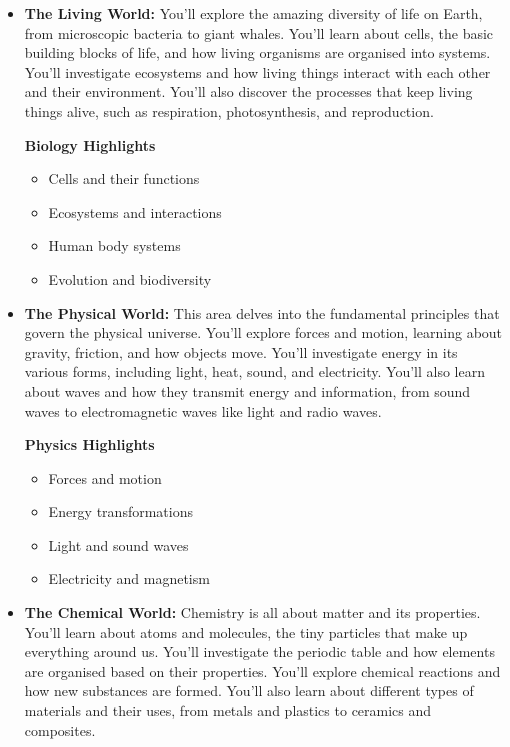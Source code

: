 \begin{itemize}
    \item \textbf{The Living World:}  You'll explore the amazing diversity of life on Earth, from microscopic bacteria to giant whales. You’ll learn about cells, the basic building blocks of life, and how living organisms are organised into systems. You'll investigate ecosystems and how living things interact with each other and their environment.  You'll also discover the processes that keep living things alive, such as respiration, photosynthesis, and reproduction.

    \begin{marginnote}
    \textbf{Biology Highlights}
    \begin{itemize}
        \item Cells and their functions
        \item Ecosystems and interactions
        \item Human body systems
        \item Evolution and biodiversity
    \end{itemize}
    \end{marginnote}

    \item \textbf{The Physical World:}  This area delves into the fundamental principles that govern the physical universe. You'll explore forces and motion, learning about gravity, friction, and how objects move.  You'll investigate energy in its various forms, including light, heat, sound, and electricity.  You'll also learn about waves and how they transmit energy and information, from sound waves to electromagnetic waves like light and radio waves.

    \begin{marginnote}
    \textbf{Physics Highlights}
    \begin{itemize}
        \item Forces and motion
        \item Energy transformations
        \item Light and sound waves
        \item Electricity and magnetism
    \end{itemize}
    \end{marginnote}

    \item \textbf{The Chemical World:}  Chemistry is all about matter and its properties.  You'll learn about atoms and molecules, the tiny particles that make up everything around us.  You’ll investigate the periodic table and how elements are organised based on their properties.  You'll explore chemical reactions and how new substances are formed.  You’ll also learn about different types of materials and their uses, from metals and plastics to ceramics and composites.


\end{itemize}
